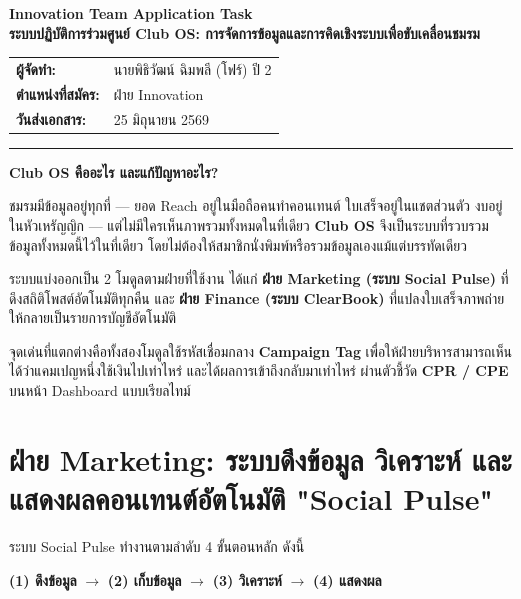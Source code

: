 \documentclass[10pt,a4paper]{article}
\begin{document}
\begin{center}
  \vspace*{0.3cm}
  {\Huge\bfseries\chulafont\color{chulapink} Innovation Team Application Task}\\[0.1cm]
  {\Large\bfseries\chulafont\color{darkblue} ระบบปฏิบัติการร่วมศูนย์ Club OS: การจัดการข้อมูลและการคิดเชิงระบบเพื่อขับเคลื่อนชมรม}\\[0.3cm]
  \begin{tabular}{ll}
    \textbf{ผู้จัดทำ:} & นายพิธิวัฒน์ ฉิมพลี (โฟร์) ปี 2 \\
    \textbf{ตำแหน่งที่สมัคร:} & ฝ่าย Innovation \\
    \textbf{วันส่งเอกสาร:} & 25 มิถุนายน 2569 \\
  \end{tabular}
  \vskip 0.3cm
  \hrule
\end{center}

\begin{highlightbox}
  \noindent \textbf{Club OS คืออะไร และแก้ปัญหาอะไร?}

  ชมรมมีข้อมูลอยู่ทุกที่ --- ยอด Reach อยู่ในมือถือคนทำคอนเทนต์ ใบเสร็จอยู่ในแชตส่วนตัว งบอยู่ในหัวเหรัญญิก --- แต่ไม่มีใครเห็นภาพรวมทั้งหมดในที่เดียว \textbf{Club OS} จึงเป็นระบบที่รวบรวมข้อมูลทั้งหมดนี้ไว้ในที่เดียว โดยไม่ต้องให้สมาชิกนั่งพิมพ์หรือรวมข้อมูลเองแม้แต่บรรทัดเดียว

  ระบบแบ่งออกเป็น 2 โมดูลตามฝ่ายที่ใช้งาน ได้แก่ \textbf{ฝ่าย Marketing (ระบบ Social Pulse)} ที่ดึงสถิติโพสต์อัตโนมัติทุกคืน และ \textbf{ฝ่าย Finance (ระบบ ClearBook)} ที่แปลงใบเสร็จภาพถ่ายให้กลายเป็นรายการบัญชีอัตโนมัติ

  จุดเด่นที่แตกต่างคือทั้งสองโมดูลใช้รหัสเชื่อมกลาง \textbf{Campaign Tag} เพื่อให้ฝ่ายบริหารสามารถเห็นได้ว่าแคมเปญหนึ่งใช้เงินไปเท่าไหร่ และได้ผลการเข้าถึงกลับมาเท่าไหร่ ผ่านตัวชี้วัด \textbf{CPR / CPE} บนหน้า Dashboard แบบเรียลไทม์
\end{highlightbox}

\section{ฝ่าย Marketing: ระบบดึงข้อมูล วิเคราะห์ และแสดงผลคอนเทนต์อัตโนมัติ "Social Pulse"}

\noindent ระบบ Social Pulse ทำงานตามลำดับ 4 ขั้นตอนหลัก ดังนี้

\begin{center}
  \textbf{(1) ดึงข้อมูล} $\longrightarrow$ \textbf{(2) เก็บข้อมูล} $\longrightarrow$ \textbf{(3) วิเคราะห์} $\longrightarrow$ \textbf{(4) แสดงผล}
\end{center}
\end{document}
